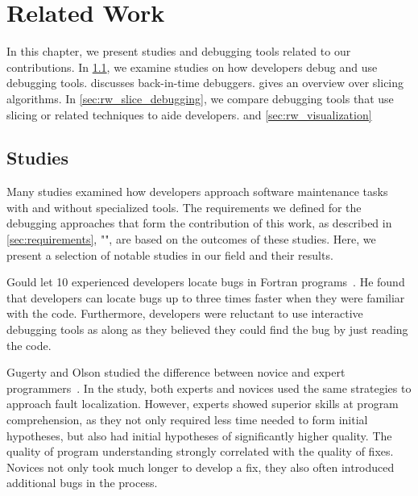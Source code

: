 
\chapter{Related Work}

In this chapter, we present studies and debugging tools related to our contributions.
In \cref{sec:rw_studies}, we examine studies on how developers debug and use debugging tools.
 discusses back-in-time debuggers.
 gives an overview over slicing algorithms.
In \cref{sec:rw_slice_debugging}, we compare debugging tools that use slicing or related techniques to aide developers.
 and 
\cref{sec:rw_visualization}


\section{Studies}
\label{sec:rw_studies}

Many studies examined how developers approach software maintenance tasks with and without specialized tools.
The requirements we defined for the debugging approaches that form the contribution of this work, as described in \cref{sec:requirements}, "", are based on the outcomes of these studies.
Here, we present a selection of notable studies in our field and their results.

Gould let 10 experienced developers locate bugs in Fortran programs~\cite{gould75:some_psychological_evidence}.
He found that developers can locate bugs up to three times faster when they were familiar with the code.
Furthermore, developers were reluctant to use interactive debugging tools as along as they believed they could find the bug by just reading the code.

Gugerty and Olson studied the difference between novice and expert programmers~\cite{gugerty86:comprehension_differences_in_debugging}.
In the study, both experts and novices used the same strategies to approach fault localization.
However, experts showed superior skills at program comprehension, as they not only required less time needed to form initial hypotheses, but also had initial hypotheses of significantly higher quality.
The quality of program understanding strongly correlated with the quality of fixes.
Novices not only took much longer to develop a fix, they also often introduced additional bugs in the process.

